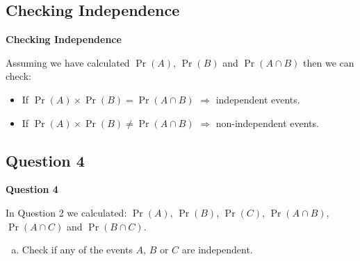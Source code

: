 \documentclass[compress]{beamer}        %
\makeatletter
\newcommand{\tcb}{\textcolor{beamer@blendedblue}}
\makeatother
\begin{document}
\subsection{Checking Independence}
\begin{frame}{\bf \tcb{Checking Independence}}

Assuming we have calculated $\Pr(A)$, $\Pr(B)$ and $\Pr(A \cap B)$ then we can check:\\[0.6cm]
\begin{itemize}\itemsep1cm
\item If $\Pr(A) \times \Pr(B) = \Pr(A \cap B)$ $\Rightarrow$ independent events.
\item If $\Pr(A) \times \Pr(B) \ne \Pr(A \cap B)$ $\Rightarrow$ non-independent events.
\end{itemize}


\end{frame}

\subsection{Question 4}
\begin{frame}{\bf \tcb{Question 4}}

In Question 2 we calculated: $\Pr(A)$, $\Pr(B)$, $\Pr(C)$, $\Pr(A\cap B)$, $\Pr(A\cap C)$ and $\Pr(B\cap C)$.\\[0.5cm]

\begin{enumerate}[a)]
\item Check if any of the events $A$, $B$ or $C$ are independent.
\end{enumerate}

\end{frame}
\end{document}
